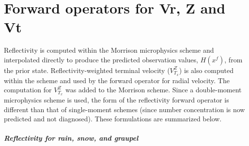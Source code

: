 \chapter{Forward operators for Vr, Z and Vt}
Reflectivity is computed within the Morrison microphysics scheme and interpolated directly to produce the predicted observation values, \(H(x^f)\), from the prior state. Reflectivity-weighted terminal velocity (\(V^Z_{T_x}\)) is also computed within the scheme and used by the forward operator for radial velocity. The computation for \(V^Z_{T_x}\) was added to the Morrison scheme. Since a double-moment microphysics scheme is used, the form of the reflectivity forward operator is different than that of single-moment schemes (since number concentration is now predicted and not diagnosed). These formulations are summarized below.

\paragraph{Reflectivity for rain, snow, and graupel}

